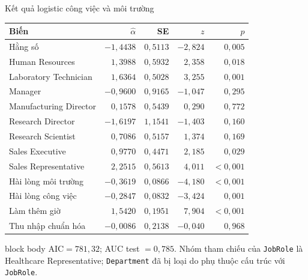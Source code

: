 \documentclass[10pt,aspectratio=169]{beamer}
\begin{document}
\begin{frame}{Kết quả logistic công việc và môi trường}
  \centering\tiny
  \renewcommand{\arraystretch}{1.02}
  \begin{tabular}{lrrrr}
    \toprule
    \textbf{Biến} & $\hat\alpha$ & \textbf{SE} & $z$ & $p$\\
    \midrule
    Hằng số & $-1{,}4438$ & $0{,}5113$ & $-2{,}824$ & $0{,}005$\\
    Human Resources & $1{,}3988$ & $0{,}5932$ & $2{,}358$ & $0{,}018$\\
    Laboratory Technician & $1{,}6364$ & $0{,}5028$ & $3{,}255$ & $0{,}001$\\
    Manager & $-0{,}9600$ & $0{,}9165$ & $-1{,}047$ & $0{,}295$\\
    Manufacturing Director & $0{,}1578$ & $0{,}5439$ & $0{,}290$ & $0{,}772$\\
    Research Director & $-1{,}6197$ & $1{,}1541$ & $-1{,}403$ & $0{,}160$\\
    Research Scientist & $0{,}7086$ & $0{,}5157$ & $1{,}374$ & $0{,}169$\\
    Sales Executive & $0{,}9770$ & $0{,}4471$ & $2{,}185$ & $0{,}029$\\
    Sales Representative & $2{,}2515$ & $0{,}5613$ & $4{,}011$ & $<0{,}001$\\
    Hài lòng môi trường & $-0{,}3619$ & $0{,}0866$ & $-4{,}180$ & $<0{,}001$\\
    Hài lòng công việc & $-0{,}2847$ & $0{,}0832$ & $-3{,}424$ & $0{,}001$\\
    Làm thêm giờ & $1{,}5420$ & $0{,}1951$ & $7{,}904$ & $<0{,}001$\\
    Thu nhập chuẩn hóa & $-0{,}0086$ & $0{,}2138$ & $-0{,}040$ & $0{,}968$\\
    \bottomrule
  \end{tabular}
  \vspace{0.16cm}
  \begin{beamercolorbox}[sep=0.11cm,rounded=true]{block body}
    \scriptsize
    $\mathrm{AIC}=781{,}32$; AUC test $=0{,}785$.
    Nhóm tham chiếu của \texttt{JobRole} là Healthcare Representative;
    \texttt{Department} đã bị loại do phụ thuộc cấu trúc với \texttt{JobRole}.
  \end{beamercolorbox}
\end{frame}
\end{document}
